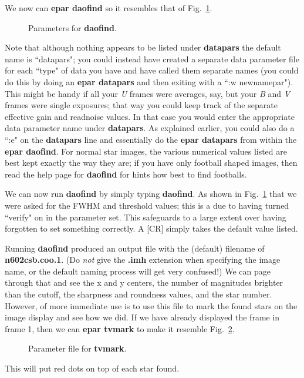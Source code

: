 We now can {\bf epar daofind} so it resembles that of
Fig.~\ref{daofind}.
\begin{figure}
\vspace{3.0in}
\caption{\label{daofind}  Parameters for {\bf daofind}.}
\end{figure}
Note that although nothing appears to be listed under {\bf datapars} the
default name is ``datapars"; you could instead have created a separate
data parameter file for each ``type" of data you have and have called
them separate names (you could do this by doing an {\bf epar datapars}
and then exiting with a ``:w newnamepar").  This might be handy if
all your {\it U} frames were averages, say, but your {\it B} and {\it V} 
frames were
single exposures; that way you could keep track of the separate
effective gain and readnoise values.  In that case you would enter the
appropriate data parameter name under {\bf datapars}.  As explained earlier,
you could also do a
``:e" on the {\bf datapars} line and essentially do the {\bf epar datapars} from
within the {\bf epar daofind}. 
For normal star images, the
various numerical values listed are best kept exactly the way they are;
if you have only football shaped images, then read the help page for
{\bf daofind} for hints how best to find footballs.

We can now run {\bf daofind} by simply typing {\bf daofind}. 
As shown in Fig.~\ref{daofind} that we were asked for the FWHM and threshold
values; this is a due to having turned ``verify" on in the parameter
set.  This safeguards to a large extent over having forgotten to set
something correctly.  A [CR] simply takes the default value listed.
 
Running {\bf daofind} produced an output file with the (default)
filename of {\bf n602csb.coo.1}.
(Do {\it not} give the {\bf .imh} extension
when specifying the image name, or the default naming
process will get very confused!) We can page
through that and see the x and y centers, the number of magnitudes
brighter than the cutoff, the sharpness and roundness values, and the
star number.  However, of more immediate use is to use this file
to mark the found stars on the image display and see how we did.
If we have already displayed the frame in frame 1, then we can {\bf epar
tvmark} to make it resemble Fig.~\ref{tvmark}.
\begin{figure}
\vspace{2.7in}
\caption{\label{tvmark} Parameter file for {\bf tvmark}.}
\end{figure}
This will put red dots on top of each star found.
 
